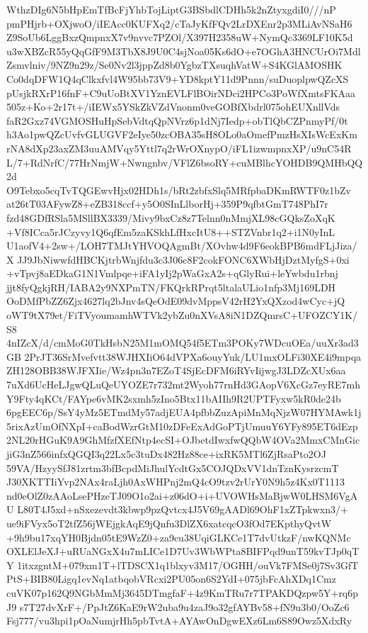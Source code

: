 {{WthzDIg6N5bHpEmTfBcFjYhbTojLiptG3BSbdlCDHh5k2nZtyxgdiI0///nP
pmPHjrb+OXjwoO/iIEAcc0KUFXq2/cTaJyKfFQv2LrDXEnr2p3MLiAvNSaH6
Z9SoUb6LggBxzQmpnxX7v9nvvc7PZOl/X397H2358uW+NymQc3369LF10K5d
u3wXBZcR55yQqGfF9M3TbX8J9U0C4sjNoa05Ks6dO+e7OGhA3HNCUrOi7Mdl
Zsmvlniv/9NZ9n29z/Se0Nv2l3jppZd8b0YgbzTXsuqhVatW+S4KGlAMOSHK
Co0dqDFW1Q4qClkxfvl4W95bb73V9+YD8kptY11d9Pnnn/suDuoplpwQZcXS
pUsjkRXrP16fnF+C9uUoBtXV1YznEVLFlBOirNDci2HPCo3PoWfXmtsFKAaa
505z+Ko+2r17t+/iIEWx5YSkZkVZdVnonm0veGOBfXbdrl075ohEUXnllVds
faR2Gxz74VGMOSHuHpSebVdtqQpNVrz6p1dNj7Iedp+obTlQbCZPnmyPf/0t
h3Ao1pwQZcUvfvGLUGVF2eIye50zcOBA35sH8OLo0aOmefPmzHsXIsWcExKm
rNA8dXp23axZM3uuAMVqy5Yttl7q2rWrOXnypO/iFL1izwmpnxXP/u9nC54R
L/7+RdNrfC/77HrNmjW+Nwngnbv/VFlZ6bsoRY+cuMBlhcYOHDB9QMHbQQ2d
O9Tebxo5cqTvTQGEwvHjx02HDh1s/bRt2zbfxSlq5MRfpbaDKmRWTF0z1bZv
at26tT03AFywZ8+eZB318ccf+y5O0SInLlborHj+359P9qfbtGmT748PhI7r
fzd48GDfRSla5MSllBX3339/Mivy9bxCz8z7Telnn0nMmjXL98cGQksZoXqK
+Vf8ICca5rJCzyvy1Q6qfEm5zaKSkhLfHxcItU8++STZVnbr1q2+i1N0yInL
U1aofV4+2sw+/LOH7TMJtYHVOQAgmBt/XOvhw4d9F6eokBPB6mdFLjJiza/X
JJ9JbNiwwfdHBCKjtrbWnjfdu3c3J06c8F2cokFONC6XWbHjDztMyfgS+0xi
+vTpvj8aEDkaG1N1Vmlpqe+iFA1yIj2pWaGxA2s+qGlyRui+leYwbdu1rbnj
jjt8fyQgkjRH/IABA2y9NXPmTN/FKQrkRPrqt5ltalaULio1nfp3Mj169LDH
OoDMfPbZZ6Zjx4627lq2bJnv4sQeOdE09dvMppsV42rH2YxQXzod4wCyc+jQ
oWT9tX79et/FiTVyoumamhWTVk2ybZu0nXVsA8iN1DZQmrsC+UFOZCY1K/S8
4nIZcX/d/cmMoG0TkHsbN25M1mOMQ54f5ETm3POKy7WDcuOEa/uuXr3ad3GB
2PrJT36SrMvefvtt38WJHXIiO64dVPXa6ouyYuk/LU1mxOLFi30XE4i9mpqa
ZH128OBB38WJFXIie/Wz4pn3n7EZoT4SjEcDFM6iRYvIijwgJ3LDZcXUx6aa
7uXd6UcHeLJgwQLuQeUYOZE7r732mt2Wyoh77rnHd3GAopV6XcGz7eyRE7mh
Y9Fty4qKCt/FAYpe6vMK2sxmh5zIno5Btx11bAIIh9R2UPTFyxw5kR0de24b
6pgEEC6p/SsY4yMz5ETmdMy57adjEUA4pfbbZuzApiMnMqNjzW07HYMAwk1j
5rixAzUmOfNXpI+caBodWzrGtM10zDFeExAdGoPTjUmuuY6YFy895ET6dEzp
2NL20rHGuK9A9GhMfzfXEfNtp4ecSI+OJbetdIwxfwQQbW4OVa2MmxCMnGic
jiG3nZ566infxQGQI3q22Lx5c3tuDx482Hz88ce+ixRK5MTl6ZjRsaPto2OJ
59VA/HzyySfJ81zrtm3bfBcpdMiJhulYcdtGx5COJQDxVV1dnTznKysrzcmT
J30XKTTIiYvp2NAx4raLjh0AxWHPnj2mQ4cO9tzv2rUrY0N9h5z4Kx0T1113
nd0eOlZ0zAAoLsePHzeTJ09O1o2ai+z06dO+i+UVOWHsMaBjwW0LHSM6VgAU
L80T4J5xd+nSxezevdt3kbwp9pzQvtcx4J5V69gAADl69OhF1xZTpkwxn3/+
ue9iFVyx5oT2tfZ56jWEjgkAqE9jQnfu3DlZX6xatcqcO3fOd7EKpthyQvtW
+9h9bu17xqYH0Bjdn05tE9WzZ0+za9cu38UqiGLKCe1T7dvUtkzF/nwKQNMc
OXLElJeXJ+uRUaNGxX4u7mLICe1D7Uv3WbWPta8BIFPqd9unT59kvTJp0qTY
1itxzgntM+079xm1T+lTDSCX1q1blxyv3M17/OGHH/ouVk7FMSe0j7Sv3GfT
PtS+BIB80Ligq1evNq1atbqobVRcxi2PU05on6S2YdI+075jbFcAhXDq1Cmz
cuVK07p162Q9NGbMmMj3645DTmgfaF+4z9KmTRu7r7TPAKDQzpw5Y+rq6pJ9
s7T27dvXrF+/PpJtZ6KaE9rW2uba9u4zaJ9o32gfAYBv58+fN9u3b0/OoZc6
Fsj777/vu3hpi1pOaNumjrHh5pbTvtA+AYAwOnDgwEXz6Lm6S89Owz5XdxRy
}}

